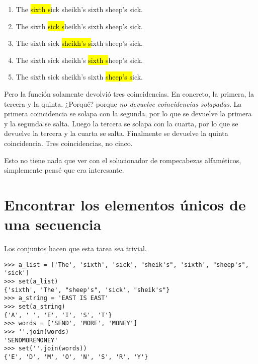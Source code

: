 \begin{enumerate}

\item The\hl{ sixth s}ick sheikh's sixth sheep's sick.
\item The sixth\hl{ sick s}heikh's sixth sheep's sick.
\item The sixth sick\hl{ sheikh's s}ixth sheep's sick.
\item The sixth sick sheikh's\hl{ sixth s}heep's sick.
\item The sixth sick sheikh's sixth\hl{ sheep's s}ick.

\end{enumerate}

Pero la función  solamente devolvió tres coincidencias. En concreto, la primera, la tercera y la quinta. ¿Porqué? porque \emph{no devuelve coincidencias solapadas}. La primera coincidencia se solapa con la segunda, por lo que se devuelve la primera y la segunda se salta. Luego la tercera se solapa con la cuarta, por lo que se devuelve la tercera y la cuarta se salta. Finalmente se devuelve la quinta coincidencia. Tres coincidencias, no cinco.

Esto no tiene nada que ver con el solucionador de rompecabezas alfaméticos, simplemente pensé que era interesante.

\section{Encontrar los elementos únicos de una secuencia}

Los conjuntos hacen que esta tarea sea trivial.

\noindent\begin{minipage}{\textwidth}
\begin{lstlisting}[mathescape=True]
>>> a_list = ['The', 'sixth', 'sick', "sheik's", 'sixth', "sheep's", 'sick']
>>> set(a_list)
{'sixth', 'The', "sheep's", 'sick', "sheik's"}
>>> a_string = 'EAST IS EAST'
>>> set(a_string)
{'A', ' ', 'E', 'I', 'S', 'T'}
>>> words = ['SEND', 'MORE', 'MONEY']
>>> ''.join(words)
'SENDMOREMONEY'
>>> set(''.join(words))
{'E', 'D', 'M', 'O', 'N', 'S', 'R', 'Y'}
\end{lstlisting}
\end{minipage}

